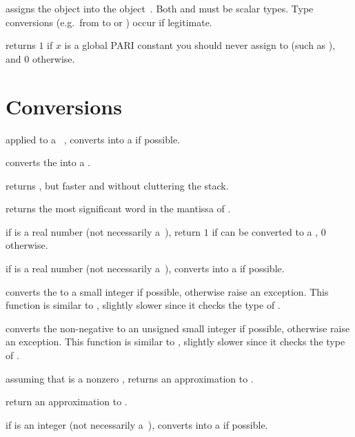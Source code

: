  assigns the object  into the
object~. Both  and  must be scalar types. Type
conversions (e.g.~from  to  or ) occur if
legitimate.

 returns $1$ if $x$ is a global PARI
constant you should never assign to (such as ), and $0$
otherwise.

\section{Conversions}


 applied to a ~, converts 
into a  if possible.

 converts the   into a
.

 returns , but
faster and without cluttering the stack.

 returns the most significant word
in the mantissa of .

 if  is a real number (not necessarily
a~), return $1$ if  can be converted to a ,
$0$ otherwise.

 if  is a real number (not necessarily
a~), converts  into a  if possible.

 converts the   to a small
integer if possible, otherwise raise an exception. This function
is similar to , slightly slower since it checks the type of .

 converts the non-negative   to
an unsigned small integer if possible, otherwise raise an exception. This
function is similar to , slightly slower since it checks the type
of .

 assuming that  is a nonzero ,
returns an approximation to .

 return an approximation to .

 if  is an integer (not necessarily
a~), converts  into a  if possible.

